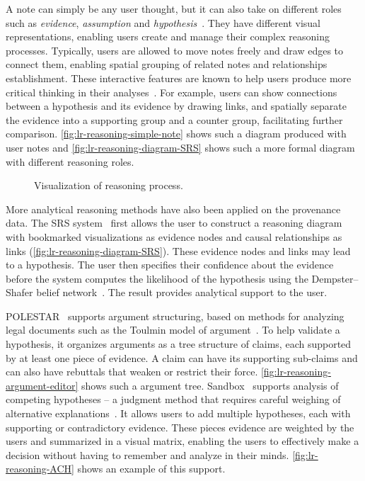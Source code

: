 A note can simply be any user thought, but it can also take on different roles such as \emph{evidence}, \emph{assumption} and \emph{hypothesis}~\cite{Pike2009}. They have different visual representations, enabling users create and manage their complex reasoning processes. Typically, users are allowed to move notes freely and draw edges to connect them, enabling spatial grouping of related notes and relationships establishment. These interactive features are known to help users produce more critical thinking in their analyses~\cite{Sedig2013}. For example, users can show connections between a hypothesis and its evidence by drawing links, and spatially separate the evidence into a supporting group and a counter group, facilitating further comparison. \autoref{fig:lr-reasoning-simple-note} shows such a diagram produced with user notes and \autoref{fig:lr-reasoning-diagram-SRS} shows such a more formal diagram with different reasoning roles.

\begin{figure}[!htb]
\centering
{}
\hfill
{}
\caption{Visualization of reasoning process.}
\end{figure}

More analytical reasoning methods have also been applied on the provenance data. The SRS system~\cite{Pike2009} first allows the user to construct a reasoning diagram with bookmarked visualizations as evidence nodes and causal relationships as links (\autoref{fig:lr-reasoning-diagram-SRS}). These evidence nodes and links may lead to a hypothesis. The user then specifies their confidence about the evidence before the system computes the likelihood of the hypothesis using the Dempster–Shafer belief network~\cite{Sanfilippo2007}. The result provides analytical support to the user. 

POLESTAR~\cite{Pioch2006} supports argument structuring, based on methods for analyzing legal documents such as the Toulmin model of argument~\cite{Toulmin2003}. To help validate a hypothesis, it organizes arguments as a tree structure of claims, each supported by at least one piece of evidence. A claim can have its supporting sub-claims and can also have rebuttals that weaken or restrict their force. \autoref{fig:lr-reasoning-argument-editor} shows such a argument tree. Sandbox~\cite{Wright2006} supports analysis of competing hypotheses -- a judgment method that requires careful weighing of alternative explanations~\cite{Heuer1999}. It allows users to add multiple hypotheses, each with supporting or contradictory evidence. These pieces evidence are weighted by the users and summarized in a visual matrix, enabling the users to effectively make a decision without having to remember and analyze in their minds. \autoref{fig:lr-reasoning-ACH} shows an example of this support.

